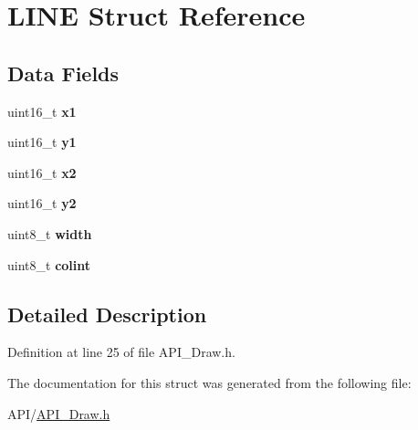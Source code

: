 \hypertarget{struct_l_i_n_e}{}\section{L\+I\+NE Struct Reference}
\label{struct_l_i_n_e}
\subsection*{Data Fields}
\begin{DoxyCompactItemize}
\item 
\mbox{\label{struct_l_i_n_e_aedb5fdfe3c1d1a915b668ba7f3950753}} 
uint16\+\_\+t {\bfseries x1}
\item 
\mbox{\label{struct_l_i_n_e_a47ada631c22a9d40348069145654f255}} 
uint16\+\_\+t {\bfseries y1}
\item 
\mbox{\label{struct_l_i_n_e_ac5bc000f8954f38b7a641a485a26bae7}} 
uint16\+\_\+t {\bfseries x2}
\item 
\mbox{\label{struct_l_i_n_e_aa377184ba406b3f0c4ac18c935378204}} 
uint16\+\_\+t {\bfseries y2}
\item 
\mbox{\label{struct_l_i_n_e_a09a2a45f731b02946ff6d3cd15c1a476}} 
uint8\+\_\+t {\bfseries width}
\item 
\mbox{\label{struct_l_i_n_e_a21caa4b27a71b7967f1a2d64f196a674}} 
uint8\+\_\+t {\bfseries colint}
\end{DoxyCompactItemize}


\subsection{Detailed Description}


Definition at line 25 of file A\+P\+I\+\_\+\+Draw.\+h.



The documentation for this struct was generated from the following file\+:\begin{DoxyCompactItemize}
\item 
A\+P\+I/\hyperlink{_a_p_i___draw_8h}{A\+P\+I\+\_\+\+Draw.\+h}\end{DoxyCompactItemize}
